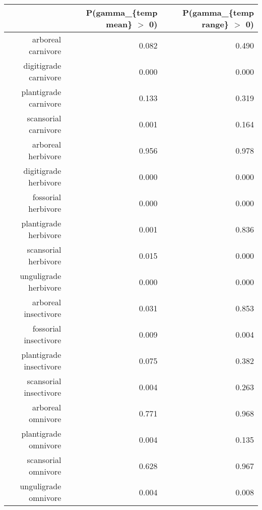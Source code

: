 \begin{table}[ht]
\centering
\begin{tabular}{rrr}
  \hline
 & P(gamma\_\{temp mean\} $>$ 0) & P(gamma\_\{temp range\} $>$ 0) \\ 
  \hline
arboreal carnivore & 0.082 & 0.490 \\ 
  digitigrade carnivore & 0.000 & 0.000 \\ 
  plantigrade carnivore & 0.133 & 0.319 \\ 
  scansorial carnivore & 0.001 & 0.164 \\ 
  arboreal herbivore & 0.956 & 0.978 \\ 
  digitigrade herbivore & 0.000 & 0.000 \\ 
  fossorial herbivore & 0.000 & 0.000 \\ 
  plantigrade herbivore & 0.001 & 0.836 \\ 
  scansorial herbivore & 0.015 & 0.000 \\ 
  unguligrade herbivore & 0.000 & 0.000 \\ 
  arboreal insectivore & 0.031 & 0.853 \\ 
  fossorial insectivore & 0.009 & 0.004 \\ 
  plantigrade insectivore & 0.075 & 0.382 \\ 
  scansorial insectivore & 0.004 & 0.263 \\ 
  arboreal omnivore & 0.771 & 0.968 \\ 
  plantigrade omnivore & 0.004 & 0.135 \\ 
  scansorial omnivore & 0.628 & 0.967 \\ 
  unguligrade omnivore & 0.004 & 0.008 \\ 
   \hline
\end{tabular}
\label{tab:occur_temp}
\end{table}

